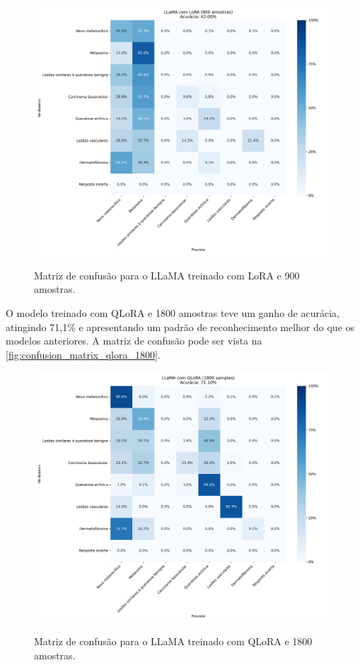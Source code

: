 \begin{figure}[ht]
    \centering
    \caption{\small Matriz de confusão para o \ac{LLaMA} treinado com \ac{LoRA} e 900 amostras.}
    \includegraphics[width=1\columnwidth,keepaspectratio]{images/confusion_matrix_lora_900.png}
    \label{fig:confusion_matrix_lora_900}
\end{figure}


O modelo treinado com \ac{QLoRA} e 1800 amostras teve um ganho de acurácia, atingindo 71,1\% e apresentando um padrão de reconhecimento melhor do que os modelos
anteriores. A matriz de confusão pode ser vista na \autoref{fig:confusion_matrix_qlora_1800}.

\clearpage

\begin{figure}[ht]
    \centering
    \caption{\small Matriz de confusão para o \ac{LLaMA} treinado com \ac{QLoRA} e 1800 amostras.}
    \includegraphics[width=1\columnwidth,keepaspectratio]{images/confusion_matrix_qlora_1800.png}
    \label{fig:confusion_matrix_qlora_1800}
\end{figure}

